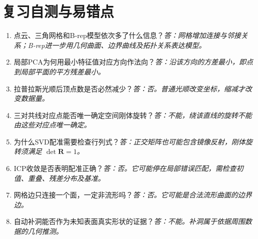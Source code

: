 \Needspace{11cm}
\section{复习自测与易错点}
\begin{enumerate}
\item 点云、三角网格和B-rep模型依次多了什么信息？\textit{答：网格增加连接与邻接关系；B-rep进一步用几何曲面、边界曲线及拓扑关系表达模型。}
\item 局部PCA为何用最小特征值对应方向作法向？\textit{答：沿该方向的方差最小，即点到局部平面的平方残差最小。}
\item 拉普拉斯光顺后顶点数是否必然减少？\textit{答：否。普通光顺改变坐标，缩减才改变数据量。}
\item 三对共线对应点能否唯一确定空间刚体旋转？\textit{答：不能，绕该直线的旋转不能由这些对应点唯一确定。}
\item 为什么SVD配准需要检查行列式？\textit{答：正交矩阵也可能包含镜像反射，刚体旋转须满足 $\det\mathbf R=1$。}
\item ICP收敛是否表明配准正确？\textit{答：否。它可能停在局部错误匹配，需检查初值、重叠、残差分布及基准。}
\item 网格边只连接一个面，一定非流形吗？\textit{答：否。它可能是合法流形曲面的边界边。}
\item 自动补洞能否作为未知表面真实形状的证据？\textit{答：不能。补洞属于依据周围数据的几何推测。}
\end{enumerate}

